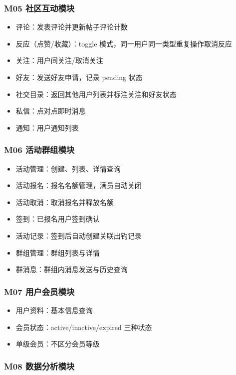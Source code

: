 \documentclass[12pt,a4paper]{ctexart}
\begin{document}
\subsubsection{M05 社区互动模块}

\begin{itemize}
  \item 评论：发表评论并更新帖子评论计数
  \item 反应（点赞/收藏）：toggle 模式，同一用户同一类型重复操作取消反应
  \item 关注：用户间关注/取消关注
  \item 好友：发送好友申请，记录 pending 状态
  \item 社交目录：返回其他用户列表并标注关注和好友状态
  \item 私信：点对点即时消息
  \item 通知：用户通知列表
\end{itemize}

\subsubsection{M06 活动群组模块}

\begin{itemize}
  \item 活动管理：创建、列表、详情查询
  \item 活动报名：报名名额管理，满员自动关闭
  \item 活动取消：取消报名并释放名额
  \item 签到：已报名用户签到确认
  \item 活动记录：签到后自动创建关联出钓记录
  \item 群组管理：群组列表与详情
  \item 群消息：群组内消息发送与历史查询
\end{itemize}

\subsubsection{M07 用户会员模块}

\begin{itemize}
  \item 用户资料：基本信息查询
  \item 会员状态：active/inactive/expired 三种状态
  \item 单级会员：不区分会员等级
\end{itemize}

\subsubsection{M08 数据分析模块}
\end{document}
